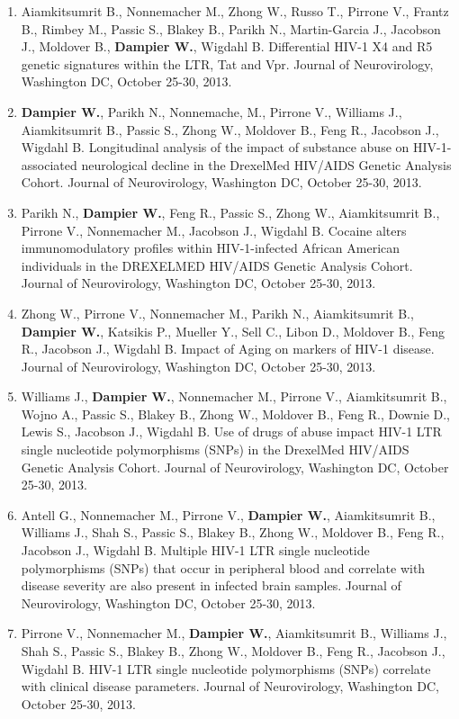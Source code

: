 \documentclass[a4paper,10pt]{article}
\begin{document}
\begin{enumerate}
\begin{itemize}
\begin{enumerate}[label=\arabic{enumii}.]
   \item Aiamkitsumrit B., Nonnemacher M., Zhong W., Russo T., Pirrone V., Frantz B., Rimbey M., Passic S., Blakey B., Parikh N., Martin-Garcia J., Jacobson J., Moldover B., \textbf{Dampier W.}, Wigdahl B. Differential HIV-1 X4 and R5 genetic signatures within the LTR, Tat and Vpr. Journal of Neurovirology, Washington DC, October 25-30, 2013.
   \item \textbf{Dampier W.}, Parikh N., Nonnemache, M., Pirrone V., Williams J., Aiamkitsumrit B., Passic S., Zhong W., Moldover B., Feng R., Jacobson J., Wigdahl B. Longitudinal analysis of the impact of substance abuse on HIV-1-associated neurological decline in the DrexelMed HIV/AIDS Genetic Analysis Cohort. Journal of Neurovirology, Washington DC, October 25-30, 2013.
   \item Parikh N., \textbf{Dampier W.}, Feng R., Passic S., Zhong W., Aiamkitsumrit B., Pirrone V., Nonnemacher M., Jacobson J., Wigdahl B. Cocaine alters immunomodulatory profiles within HIV-1-infected African American individuals in the DREXELMED HIV/AIDS Genetic Analysis Cohort. Journal of Neurovirology, Washington DC, October 25-30, 2013.
   \item Zhong W., Pirrone V., Nonnemacher M., Parikh N., Aiamkitsumrit B., \textbf{Dampier W.}, Katsikis P., Mueller Y., Sell C., Libon D., Moldover B., Feng R., Jacobson J., Wigdahl B. Impact of Aging on markers of HIV-1 disease. Journal of Neurovirology, Washington DC, October 25-30, 2013.
   \item Williams J., \textbf{Dampier W.}, Nonnemacher M., Pirrone V., Aiamkitsumrit B., Wojno A., Passic S., Blakey B., Zhong W., Moldover B., Feng R., Downie D., Lewis S., Jacobson J., Wigdahl B. Use of drugs of abuse impact HIV-1 LTR single nucleotide polymorphisms (SNPs) in the DrexelMed HIV/AIDS Genetic Analysis Cohort. Journal of Neurovirology, Washington DC, October 25-30, 2013.
   \item Antell G., Nonnemacher M., Pirrone V., \textbf{Dampier W.}, Aiamkitsumrit B., Williams J., Shah S., Passic S., Blakey B., Zhong W., Moldover B., Feng R., Jacobson J., Wigdahl B. Multiple HIV-1 LTR single nucleotide polymorphisms (SNPs) that occur in peripheral blood and correlate with disease severity are also present in infected brain samples. Journal of Neurovirology, Washington DC, October 25-30, 2013.
   \item Pirrone V., Nonnemacher M., \textbf{Dampier W.}, Aiamkitsumrit B., Williams J., Shah S., Passic S., Blakey B., Zhong W., Moldover B., Feng R., Jacobson J., Wigdahl B. HIV-1 LTR single nucleotide polymorphisms (SNPs) correlate with clinical disease parameters. Journal of Neurovirology, Washington DC, October 25-30, 2013.
  \end{enumerate}


\end{itemize}
\end{enumerate}
\end{document}
